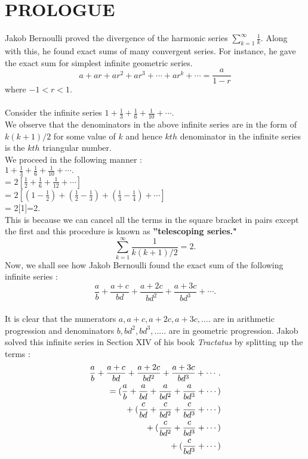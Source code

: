\documentclass[a4paper,reqno,11pt]{amsart}
\theoremstyle{plain}%
\begin{document}
\section*{PROLOGUE}
Jakob Bernoulli proved the divergence of 
the harmonic series $\sum_{k=1}^{\infty}\frac{1}{k}$. Along with this, he found exact sums of many convergent series. For instance, he gave the exact sum for simplest infinite geometric series.\\
$$a + ar + ar^2 + ar^3 + \cdots + ar^k + \cdots = \frac{a}{1-r}$$
where $-1 < r < 1.$\\
\\
Consider the infinite series $1 + \frac{1}{3} + \frac{1}{6} + \frac{1}{10} + \cdots.$\\
We observe that the denominators in the above infinite series are in the form of $k(k+1)/2$ for some value of $k$ and hence $kth$ denominator in the infinite series is the $kth$ triangular number.\\
We proceed in the following manner :\\
$1 + \frac{1}{3} + \frac{1}{6} + \frac{1}{10} + \cdots.$\\
= $2[\frac{1}{2} + \frac{1}{6} + \frac{1}{12} + \cdots ]$\\
= $2[(1-\frac{1}{2}) + (\frac{1}{2}-\frac{1}{3}) + (\frac{1}{3}-\frac{1}{4}) + \cdots]$\\
= 2[1]=2.\\
This is because we can cancel all the terms in the square bracket in pairs except the first and this procedure is known as \textbf{''telescoping series."}\\
$$\sum_{k=1}^{\infty} \frac{1}{k(k+1)/2} = 2.$$
\noindent Now, we shall see how Jakob Bernoulli found the exact sum of the following infinite series :\\
$$ \frac{a}{b} + \frac{a+c}{bd} + \frac{a+2c}{bd^2} + \frac{a+3c}{bd^3} + \cdots.$$
\\
It is clear that the numerators $a,a+c,a+2c,a+3c,.... $ are in arithmetic progression and denominators $b,bd^2,bd^3,.....$ are in geometric progression.
Jakob solved this infinite series in Section XIV of his book \textit{Tractatus} by splitting up the terms :\\
\begin{eqnarray*}
\frac{a}{b} + \frac{a+c}{bd} + \frac{a+2c}{bd^2} + \frac{a+3c}{bd^3} + \cdots.\\
= (\frac{a}{b} + \frac{a}{bd} + \frac{a}{bd^2} + \frac{a}{bd^3} + \cdots)\\
 \indent + (\frac{c}{bd} + \frac{c}{bd^2} + \frac{c}{bd^3} + \cdots)\\
\indent + (\frac{c}{bd^2} + \frac{c}{bd^3} + \cdots)\\
  \indent + (\frac{c}{bd^3} + \cdots)\\
  \end{eqnarray*}
\end{document}
